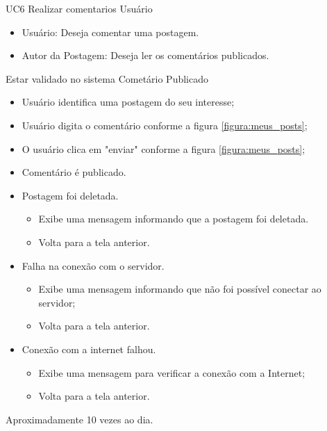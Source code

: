 \casoDeUso
{UC6}
{Realizar comentarios}
{Usuário}
{
\begin{itemize}
	\item Usuário: Deseja comentar uma postagem.
	\item Autor da Postagem: Deseja ler os comentários publicados.
\end{itemize}

}
{Estar validado no sistema}
{Cometário Publicado}
{
\begin{itemize}
	\item Usuário identifica uma postagem do seu interesse;
	\item Usuário digita o comentário conforme a figura \ref{figura:meus_posts};
	\item O usuário clica em "enviar" conforme a figura \ref{figura:meus_posts};
	\item Comentário é publicado.
\end{itemize}
}
{
\begin{itemize}
	\item Postagem foi deletada.
	\begin{itemize}
		\item Exibe uma mensagem informando que a postagem foi deletada.
		\item Volta para a tela anterior.
	\end{itemize}
	
	\item Falha na conexão com o servidor.
	
	\begin{itemize}
		\item Exibe uma mensagem informando que não foi possível conectar ao servidor;
		\item Volta para a tela anterior.
	\end{itemize}
	
	\item Conexão com a internet falhou.
	\begin{itemize}
		\item Exibe uma mensagem para verificar a conexão com a Internet;
		\item Volta para a tela anterior.
	\end{itemize}

	
	
\end{itemize}
}
{Aproximadamente 10 vezes ao dia.}
{

}

